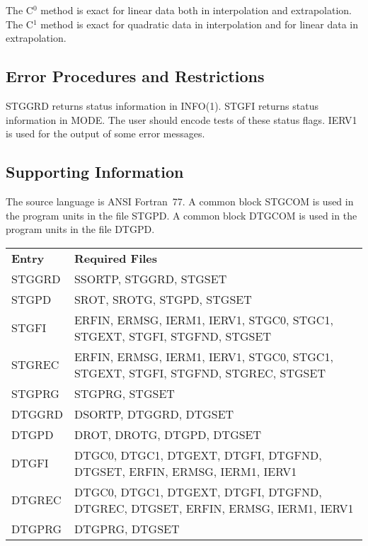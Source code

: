 \documentclass[twoside]{MATH77}
\begin{document}
The C$^0$ method is exact for linear data both in interpolation and
extrapolation.  The C$^1$ method is exact for quadratic data in
interpolation and for linear data in extrapolation.




\subsection{Error Procedures and Restrictions}
STGGRD returns status information in INFO(1).
STGFI returns status information in MODE.
The user should encode tests of these status flags.
IERV1 is used for the output of some error messages.
\subsection{Supporting Information}

The source language is ANSI Fortran~77.  A common block STGCOM is
used in the program units in the file STGPD.
A common block DTGCOM is
used in the program units in the file DTGPD.

\begin{tabular}{@{\bf}l@{\hspace{5pt}}l}
\bf Entry & \hspace{.35in} {\bf Required Files}\vspace{2pt} \\
STGGRD & \parbox[t]{2.7in}{ \raggedright
SSORTP, STGGRD, STGSET\rule[-5pt]{0pt}{8pt}}\\
STGPD & \parbox[t]{2.7in}{ \raggedright
SROT, SROTG, STGPD, STGSET\rule[-5pt]{0pt}{8pt}}\\
STGFI & \parbox[t]{2.7in}{ \raggedright
ERFIN, ERMSG, IERM1, IERV1, STGC0, STGC1, STGEXT, STGFI,
STGFND, STGSET\rule[-5pt]{0pt}{8pt}}\\
STGREC & \parbox[t]{2.7in}{ \raggedright
ERFIN, ERMSG, IERM1, IERV1, STGC0, STGC1, STGEXT, STGFI,
STGFND, STGREC, STGSET\rule[-5pt]{0pt}{8pt}}\\
STGPRG & \parbox[t]{2.7in}{ \raggedright
STGPRG, STGSET\rule[-5pt]{0pt}{8pt}}\\
DTGGRD & \parbox[t]{2.7in}{ \raggedright
DSORTP, DTGGRD, DTGSET\rule[-5pt]{0pt}{8pt}}\\
DTGPD & \parbox[t]{2.7in}{ \raggedright
DROT, DROTG, DTGPD, DTGSET\rule[-5pt]{0pt}{8pt}}\\
DTGFI & \parbox[t]{2.7in}{ \raggedright
DTGC0, DTGC1, DTGEXT, DTGFI, DTGFND, DTGSET, ERFIN,
ERMSG, IERM1, IERV1\rule[-5pt]{0pt}{8pt}}\\
DTGREC & \parbox[t]{2.7in}{ \raggedright
DTGC0, DTGC1, DTGEXT, DTGFI, DTGFND, DTGREC, DTGSET,
ERFIN, ERMSG, IERM1, IERV1\rule[-5pt]{0pt}{8pt}}\\
DTGPRG & \parbox[t]{2.7in}{ \raggedright
DTGPRG, DTGSET}\\
\end{tabular}
\end{document}
